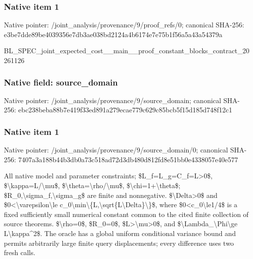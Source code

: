 \documentclass[10pt,a4paper]{article}
\begin{document}
\subsubsection{Native item 1}


Native pointer: /joint\_analysis/provenan\allowbreak{}ce/9/proof\_refs/0; canonical SHA-256: e3be7dde89be4039356e7db3\allowbreak{}ae038bd2124a4b6174e7e75b\allowbreak{}1f56a5a43a54379a


BL\_SPEC\_joint\_expected\_c\allowbreak{}ost\_\_main\_\_proof\_constan\allowbreak{}t\_blocks\_contract\_202611\allowbreak{}26


\subsubsection{Native field: source\_domain}


Native pointer: /joint\_analysis/provenan\allowbreak{}ce/9/source\_domain; canonical SHA-256: ebc238beba88b7e419f33ed8\allowbreak{}91a279ecae779c629c85bcb5\allowbreak{}f15d185d748f12c1



\subsubsection{Native item 1}


Native pointer: /joint\_analysis/provenan\allowbreak{}ce/9/source\_domain/0; canonical SHA-256: 7407a3a188b44b3db0a73c51\allowbreak{}8ad72d3db480d812fd8e51bb\allowbreak{}0e4338057e40e577


All native model and parameter constraints; \$L\_f=L\_g=C\_f=L>0\$, \$\textbackslash{}kappa=L/\textbackslash{}mu\$, \$\textbackslash{}theta=\textbackslash{}rho/\textbackslash{}mu\$, \$\textbackslash{}chi=1+\textbackslash{}theta\$; \$R\_0,\textbackslash{}sigma\_f,\textbackslash{}sigma\_g\$ are finite and nonnegative. \$\textbackslash{}Delta>0\$ and \$0<\textbackslash{}varepsilon\textbackslash{}le c\_0\textbackslash{}min\textbackslash{}\{L,\textbackslash{}sqrt\{L\textbackslash{}Delta\}\textbackslash{}\}\$, where \$0<c\_0\textbackslash{}le1/4\$ is a fixed sufficiently small numerical constant common to the cited finite collection of source theorems. \$\textbackslash{}rho=0\$, \$R\_0=0\$, \$L>\textbackslash{}mu>0\$, and \$\textbackslash{}Lambda\_\textbackslash{}Phi\textbackslash{}ge L\textbackslash{}kappa\textasciicircum{}2\$. The oracle has a global uniform conditional variance bound and permits arbitrarily large finite query displacements; every difference uses two fresh calls.
\end{document}
